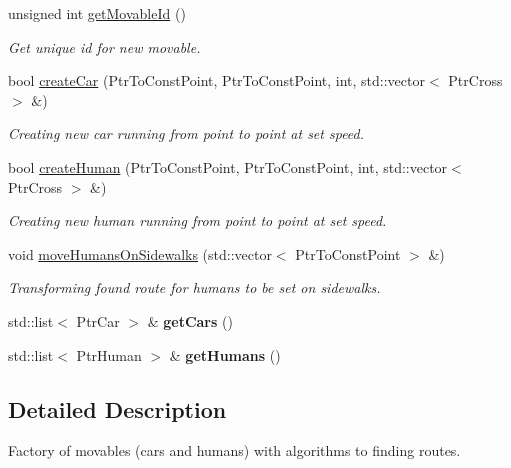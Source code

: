 \begin{DoxyCompactItemize}
unsigned int \hyperlink{classMovableFactory_a3e6a2b041b143eee4b139001c0efb233}{get\-Movable\-Id} ()
\begin{DoxyCompactList}\small\item\em Get unique id for new movable. \end{DoxyCompactList}\item 
bool \hyperlink{classMovableFactory_a7947ef24e338a9c06145eb1665666ea3}{create\-Car} (Ptr\-To\-Const\-Point, Ptr\-To\-Const\-Point, int, std\-::vector$<$ Ptr\-Cross $>$ \&)
\begin{DoxyCompactList}\small\item\em Creating new car running from point to point at set speed. \end{DoxyCompactList}\item 
bool \hyperlink{classMovableFactory_a218fc6471b2d6d17c7d00697160f9d02}{create\-Human} (Ptr\-To\-Const\-Point, Ptr\-To\-Const\-Point, int, std\-::vector$<$ Ptr\-Cross $>$ \&)
\begin{DoxyCompactList}\small\item\em Creating new human running from point to point at set speed. \end{DoxyCompactList}\item 
void \hyperlink{classMovableFactory_a56b1d3085a535d40cfe4e6ef1f3ecf6e}{move\-Humans\-On\-Sidewalks} (std\-::vector$<$ Ptr\-To\-Const\-Point $>$ \&)
\begin{DoxyCompactList}\small\item\em Transforming found route for humans to be set on sidewalks. \end{DoxyCompactList}\item 
\hypertarget{classMovableFactory_a792ef3b707099931bfab7dddbd0b776b}{std\-::list$<$ Ptr\-Car $>$ \& {\bfseries get\-Cars} ()}\label{classMovableFactory_a792ef3b707099931bfab7dddbd0b776b}

\item 
\hypertarget{classMovableFactory_ae8c900bfd2548d7fd0e8f96f81fa7412}{std\-::list$<$ Ptr\-Human $>$ \& {\bfseries get\-Humans} ()}\label{classMovableFactory_ae8c900bfd2548d7fd0e8f96f81fa7412}

\end{DoxyCompactItemize}


\subsection{Detailed Description}
Factory of movables (cars and humans) with algorithms to finding routes. 

